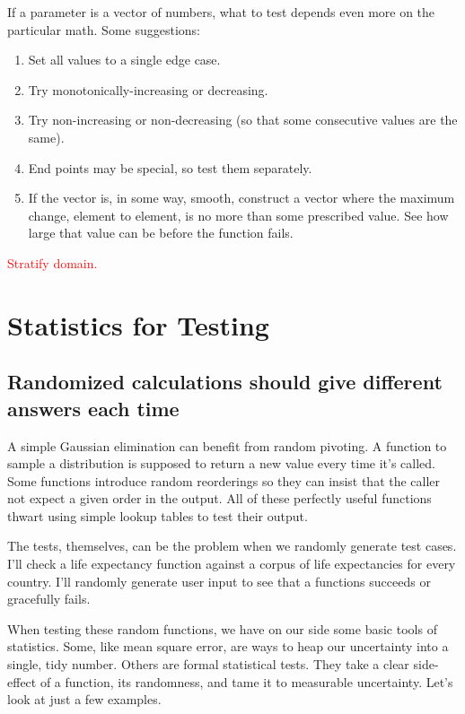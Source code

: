 \documentclass[fleqn,10pt]{olplainarticle}
\newcommand{\aside}[1]{\textcolor{red}{#1}}
\begin{document}
If a parameter is a vector of numbers, what to test depends
even more on the particular math. Some suggestions:
\begin{enumerate}
    \item Set all values to a single edge case.
    \item Try monotonically-increasing or decreasing.
    \item Try non-increasing or non-decreasing (so that some
    consecutive values are the same).
    \item End points may be special, so test them separately.
    \item If the vector is, in some way, smooth, construct
    a vector where the maximum change, element to element, is no
    more than some prescribed value. See how large that value can
    be before the function fails.
\end{enumerate}
\aside{Stratify domain.}



\section{Statistics for Testing}\label{sec:statistical}

\subsection{Randomized calculations should give different answers each time}

A simple Gaussian elimination can benefit from random pivoting.
A function to sample a distribution is supposed to return a new value
every time it's called.
Some functions introduce random reorderings
so they can insist that the caller not expect a given order
in the output. All of these perfectly useful functions
thwart using simple lookup tables to test their output.

The tests, themselves, can be the problem when we randomly
generate test cases. I'll check
a life expectancy function against a corpus of life expectancies
for every country. I'll randomly generate user input
to see that a functions succeeds or gracefully fails.

When testing these random functions,
we have on our side some basic tools
of statistics. Some, like mean square error, are ways
to heap our uncertainty into a single, tidy number.
Others are formal statistical
tests. They take a clear side-effect of a function,
its randomness, and tame it to measurable uncertainty.
Let's look at just a few examples.
\end{document}
